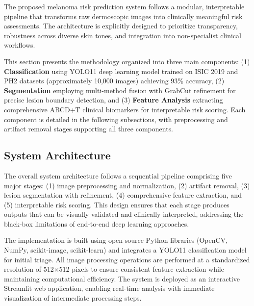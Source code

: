 \documentclass[conference]{IEEEtran}
\begin{document}
The proposed melanoma risk prediction system follows a modular, interpretable pipeline that transforms raw dermoscopic images into clinically meaningful risk assessments. The architecture is explicitly designed to prioritize transparency, robustness across diverse skin tones, and integration into non-specialist clinical workflows. 

This section presents the methodology organized into three main components: (1) \textbf{Classification} using YOLO11 deep learning model trained on ISIC 2019 and PH2 datasets (approximately 10,000 images) achieving 93\% accuracy, (2) \textbf{Segmentation} employing multi-method fusion with GrabCut refinement for precise lesion boundary detection, and (3) \textbf{Feature Analysis} extracting comprehensive ABCD+T clinical biomarkers for interpretable risk scoring. Each component is detailed in the following subsections, with preprocessing and artifact removal stages supporting all three components.

\subsection{System Architecture}

The overall system architecture follows a sequential pipeline comprising five major stages: (1) image preprocessing and normalization, (2) artifact removal, (3) lesion segmentation with refinement, (4) comprehensive feature extraction, and (5) interpretable risk scoring. This design ensures that each stage produces outputs that can be visually validated and clinically interpreted, addressing the black-box limitations of end-to-end deep learning approaches.

The implementation is built using open-source Python libraries (OpenCV, NumPy, scikit-image, scikit-learn) and integrates a YOLO11 classification model for initial triage. All image processing operations are performed at a standardized resolution of 512×512 pixels to ensure consistent feature extraction while maintaining computational efficiency. The system is deployed as an interactive Streamlit web application, enabling real-time analysis with immediate visualization of intermediate processing steps.

\end{document}
